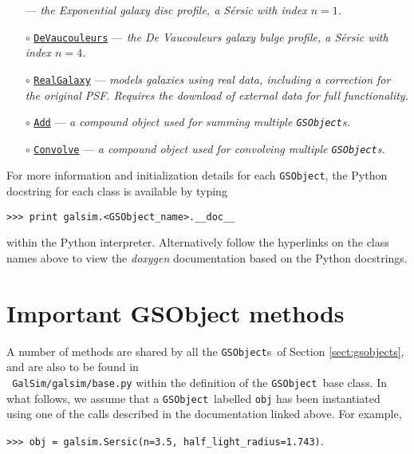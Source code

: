 \documentclass[preprint,11pt]{aastex}
\newcommand{\gsobject}{{\tt GSObject}}
\begin{document}
\begin{itemize}
  --- \emph{the Exponential galaxy disc profile, a S\'{e}rsic with index $n=1$.}
\item[$\circ$]
  \href{http://galsim-developers.github.com/GalSim/classgalsim_1_1base_1_1_de_vaucouleurs.html}{\texttt{DeVaucouleurs}}
  --- \emph{the De Vaucouleurs galaxy bulge profile, a S\'{e}rsic with index $n=4$.}
\item[$\circ$] \href{http://galsim-developers.github.com/GalSim/classgalsim_1_1base_1_1_real_galaxy.html}{\texttt{RealGalaxy}} --- \emph{models galaxies using real
  data, including a correction for the original PSF.  Requires the
  download of external data for full functionality.}
\item[$\circ$] \href{http://galsim-developers.github.com/GalSim/classgalsim_1_1base_1_1_add.html}{\texttt{Add}} --- \emph{a \emph{compound} object used for
  summing multiple \texttt{GSObject}s.}
\item[$\circ$] \href{http://galsim-developers.github.com/GalSim/classgalsim_1_1base_1_1_convolve.html}{\texttt{Convolve}} --- \emph{a \emph{compound} object used for
convolving multiple \texttt{GSObject}s.}
\end{itemize}

For more information and initialization details for each \gsobject,
the Python docstring for each class is available by typing

{\tt >>> print galsim.<GSObject\_name>.\_\_doc\_\_}

within the Python interpreter. Alternatively follow the hyperlinks on
the class names above to view the \emph{doxygen} documentation based
on the Python docstrings.

\section{Important GSObject methods}\label{sect:gsobjectmethods}
A number of methods are shared by all the \gsobject s~of Section
\ref{sect:gsobjects}, and are also to be found in \\ {\tt
  GalSim/galsim/base.py} within the definition of the \gsobject~base
class.  In what follows, we assume that a \gsobject~labelled
\texttt{obj} has been instantiated using one of the calls described in
the documentation linked above.  For example,

{\tt >>> obj = galsim.Sersic(n=3.5, half\_light\_radius=1.743)}.
\end{document}
